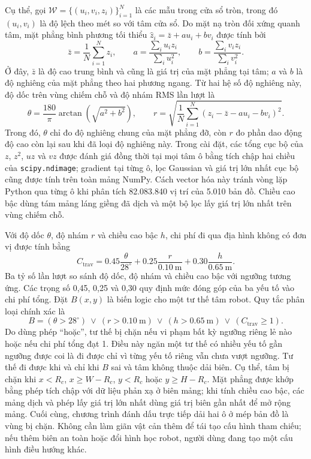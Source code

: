 \documentclass[11pt]{article}
\begin{document}
Cụ thể, gọi $\mathcal{W}=\{(u_i,v_i,z_i)\}_{i=1}^{N}$ là các mẫu trong cửa sổ
tròn, trong đó $(u_i,v_i)$ là độ lệch theo mét so với tâm cửa sổ.
Do mặt nạ tròn đối xứng quanh tâm, mặt phẳng bình phương tối thiểu
$\widehat z_i=\bar z+a u_i+b v_i$ được tính bởi
\begin{equation}
  \bar z=\frac{1}{N}\sum_{i=1}^{N}z_i,\qquad
  a=\frac{\sum_i u_i z_i}{\sum_i u_i^2},\qquad
  b=\frac{\sum_i v_i z_i}{\sum_i v_i^2}.
\end{equation}
Ở đây, $\bar z$ là độ cao trung bình và cũng là giá trị của mặt phẳng tại tâm;
$a$ và $b$ là độ nghiêng của mặt phẳng theo hai phương ngang. Từ hai hệ số độ
nghiêng này, độ dốc trên vùng chiếm chỗ và độ nhám RMS
lần lượt là
\begin{equation}
  \theta=\frac{180}{\pi}\arctan\!\left(\sqrt{a^2+b^2}\right),\qquad
  r=\sqrt{\frac{1}{N}\sum_{i=1}^{N}
  \left(z_i-\bar z-a u_i-b v_i\right)^2}.
\end{equation}
Trong đó, $\theta$ chỉ đo độ nghiêng chung của mặt phẳng đỡ, còn $r$ đo phần
dao động độ cao còn lại sau khi đã loại độ nghiêng này.
Trong cài đặt, các tổng cục bộ của $z$, $z^2$, $uz$ và $vz$ được đánh giá đồng
thời tại mọi tâm ô bằng tích chập hai chiều của
\texttt{scipy.ndimage}; gradient tại từng ô, lọc Gaussian và giá trị lớn nhất cục bộ cũng được
tính trên toàn mảng NumPy. Cách vector hóa này tránh vòng lặp Python qua từng
ô khi phân tích 82.083.840 vị trí của 5.010 bản đồ. Chiều cao bậc dùng tám mảng
láng giềng đã dịch và một bộ lọc lấy giá trị lớn nhất trên vùng chiếm chỗ.

Với độ dốc $\theta$, độ nhám $r$ và chiều cao bậc $h$, chi phí đi qua địa hình
không có đơn vị được tính bằng
\begin{equation}
  C_{\mathrm{trav}}=
  0.45\frac{\theta}{28^\circ}+
  0.25\frac{r}{0.10\ \mathrm{m}}+
  0.30\frac{h}{0.65\ \mathrm{m}}.
\end{equation}
Ba tỷ số lần lượt so sánh độ dốc, độ nhám và chiều cao bậc với ngưỡng tương
ứng. Các trọng số 0,45, 0,25 và 0,30 quy định mức đóng góp của ba yếu tố vào
chi phí tổng.
Đặt $B(x,y)$ là biến logic cho một tư thế tâm robot. Quy tắc phân loại chính
xác là
\begin{equation}
  B=(\theta>28^\circ)\ \lor\ (r>0.10\ \mathrm{m})\ \lor\
  (h>0.65\ \mathrm{m})\ \lor\ (C_{\mathrm{trav}}\geq1).
\end{equation}
Do dùng phép ``hoặc'', tư thế bị chặn nếu vi phạm bất kỳ ngưỡng riêng lẻ nào
hoặc nếu chi phí tổng đạt 1. Điều này ngăn một tư thế có nhiều yếu tố gần ngưỡng
được coi là đi được chỉ vì từng yếu tố riêng vẫn chưa vượt ngưỡng.
Tư thế đi được khi và chỉ khi $B$ sai và tâm không thuộc dải biên. Cụ thể, tâm
bị chặn khi $x<R_c$, $x\geq W-R_c$, $y<R_c$ hoặc $y\geq H-R_c$. Mặt phẳng
được khớp bằng phép tích chập với dữ liệu phản xạ ở biên mảng; khi
tính chiều cao bậc, các mảng dịch và phép lấy giá trị lớn nhất dùng giá trị biên
gần nhất để mở rộng mảng. Cuối cùng, chương trình đánh dấu trực tiếp dải hai ô
ở mép bản đồ là vùng bị chặn.
Không cần làm giãn vật cản thêm để tái tạo cấu hình tham chiếu; nếu thêm biên an
toàn hoặc đổi hình học robot, người dùng đang tạo một cấu hình điều hướng khác.
\end{document}
